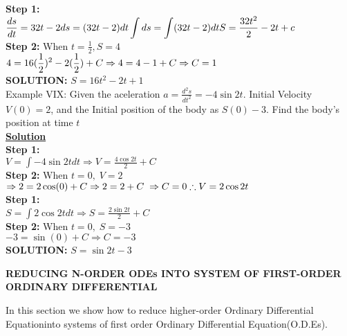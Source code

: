\documentclass[a4paper 11]{article}
\newcommand{\be}{\(\displaystyle}
\newcommand{\ee}{\)\\[0.2cm]}
\renewcommand{\sp}{\\[0.3cm]}
\newcommand{\spn}[1]{\\[#1]}
\newcommand{\bt}[1]{\textbf{#1}}
\newcommand{\NI}{\noindent}
\newcommand{\st}{\NI\bt{Step 1:}\sp}
\newcommand{\stn}[1]{\NI\bt{Step 2:} When \be #1 \ee}
\newcommand{\imp}{\Rightarrow}
\newcommand{\sol}{\NI \bt{\underline{Solution}} \spn{0.07cm}}
\newcommand{\soL}[1]{\bt{SOLUTION:} \be #1 \ee}
\newcommand{\ODE}{Ordinary Differential Equation}
\begin{document}
\st
\be \frac{ds}{dt} = 32t - 2 \spn{0.2cm}
ds = (32t - 2)dt \sp
\int ds = \int (32t - 2)dt \sp
S = \frac{32t^2}{2} - 2t + c \sp
\ee
\stn{t = \frac{1}{2}, S = 4}
\be
4 = 16(\frac{1}{2})^2 - 2 (\frac{1}{2}) + C \sp
\imp 4 = 4 - 1 + C \imp C = 1\\
\ee
\bt{SOLUTION:} \be S = 16t^2 - 2t + 1 \ee

\NI Example VIX: Given the aceleration \(a = \frac{d^{2}s}{dt^2} = -4 \sin 2t\). Initial Velocity \(V(0)=2\), and the Initial position of the body as \(S(0)-3\). Find the body's position at time \(t\)\\
\sol
\st
\be V = \int -4\sin 2t dt \imp V = \frac{4\cos 2t}{2} + C\ee
\stn{t=0, \; V=2}
\be
\imp 2 = 2 \cos(0) + C \imp 2 = 2 + C \; \imp C = 0 \sp
\therefore V = 2 \cos 2t
\ee
\st
\be
S = \int 2\cos 2t dt \imp S = \frac{2\sin 2t}{2} + C
\ee
\stn{t=0, \; S=-3}
\be
-3 = \sin(0) + C \imp C = -3
\ee
\soL{S=\sin 2t - 3}
\newpage
\begin{center}
\bt{REDUCING N-ORDER ODEs INTO SYSTEM OF FIRST-ORDER ORDINARY DIFFERENTIAL}
\end{center}
In this section we show how to reduce higher-order \ODE into systems of first order \ODE (O.D.Es).\\
\end{document}

